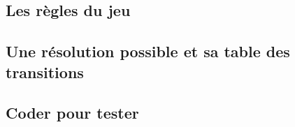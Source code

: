 \subsection{Les règles du jeu}

	


\subsection{Une résolution possible et sa table des transitions}

	


\subsection{Coder pour tester}

	